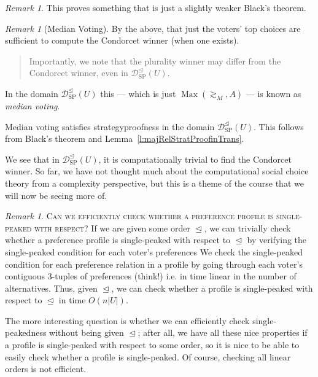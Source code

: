 \documentclass{book}
\theoremstyle{plain}
\theoremstyle{definition}
\theoremstyle{remark}
\newtheorem{remark}[theorem]{Remark}
\begin{document}
\begin{remark}
    This proves something that is just a 
    slightly weaker Black's theorem.
\end{remark}

\begin{remark}[Median Voting]
    By the above,
    that just the voters'
    top choices are sufficient 
    to compute the Condorcet winner (when one exists).
    
    \begin{quote}
        Importantly, we note that 
        the plurality winner may differ from the 
        Condorcet winner, 
        even in $\mathcal{D}_{\text{SP}}^{\trianglelefteq}(U)$.
    \end{quote}
    
    In the domain $\mathcal{D}_{\text{SP}}^{\trianglelefteq}(U)$
    this --- which is just
    $\operatorname{Max}(\gtrsim_M, A)$ --- 
    is known as \emph{median voting}.

    Median voting satisfies 
    strategyproofness in the domain $\mathcal{D}_{\text{SP}}^{\trianglelefteq}(U)$.
    This follows from Black's theorem and Lemma~\ref{l:majRelStratProofinTrans}.

    We see that in $\mathcal{D}_{\text{SP}}^{\trianglelefteq}(U)$,
    it is computationally trivial to find the Condorcet winner.
    So far, we have not thought much about the 
    computational social choice theory from a complexity perspective,
    but this is a theme of the course that we will now be seeing more of.
\end{remark}

\begin{remark}
    \textsc{Can we efficiently check whether a preference profile is 
    single-peaked with respect?}
    If we are given some order 
    $\trianglelefteq$, we can trivially check whether a preference profile is single-peaked with respect to $\trianglelefteq$
    by verifying the single-peaked condition for each voter's preferences 
    We check the single-peaked condition for each preference relation in a profile 
    by going through each voter's contiguous 3-tuples of preferences (think!) i.e. in time linear in 
    the number of alternatives.
    Thus, given $\trianglelefteq$, we can check whether a profile is single-peaked with respect to $\trianglelefteq$
    in time $O(n|U|)$.

    The more interesting question is 
    whether we can efficiently check single-peakedness without being given $\trianglelefteq$;
    after all, we have all these nice properties 
    if a profile is single-peaked with respect to some order,
    so it is nice to be able to easily check whether a profile is single-peaked.
    Of course, checking all linear orders is not efficient.
\end{remark}
\end{document}
